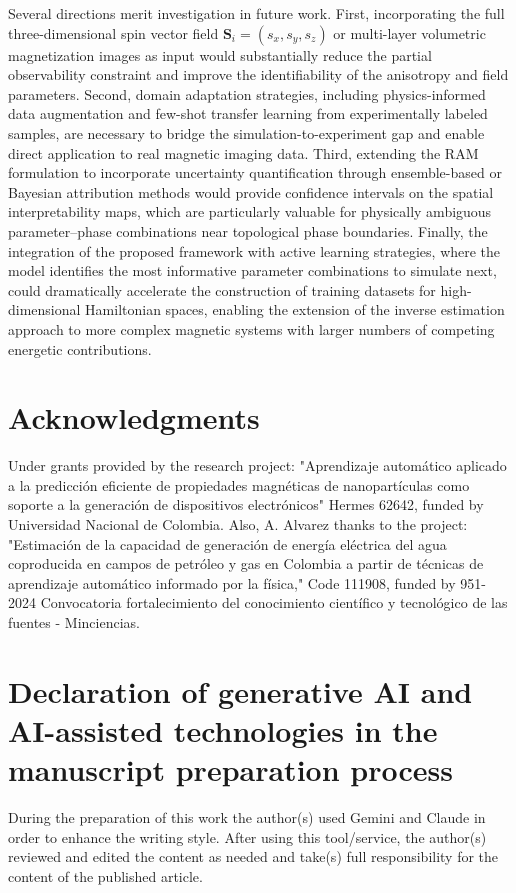 \documentclass[a4paper,fleqn]{cas-sc}
\begin{document}
Several directions merit investigation in future work. First,
incorporating the full three-dimensional spin vector field
$\mathbf{S}_i = (s_x, s_y, s_z)$ or multi-layer volumetric
magnetization images as input would substantially reduce the partial
observability constraint and improve the identifiability of the
anisotropy and field parameters. Second, domain adaptation strategies, including physics-informed data augmentation and few-shot transfer
learning from experimentally labeled samples, are necessary to
bridge the simulation-to-experiment gap and enable direct application
to real magnetic imaging data. Third, extending the RAM formulation to
incorporate uncertainty quantification through ensemble-based or
Bayesian attribution methods would provide confidence intervals on the
spatial interpretability maps, which are particularly valuable for
physically ambiguous parameter--phase combinations near topological
phase boundaries. Finally, the integration of the proposed framework
with active learning strategies, where the model identifies the
most informative parameter combinations to simulate next, could
dramatically accelerate the construction of training datasets for
high-dimensional Hamiltonian spaces, enabling the extension of the
inverse estimation approach to more complex magnetic systems with
larger numbers of competing energetic contributions.


\section*{Acknowledgments}
Under grants provided by the research project: "Aprendizaje automático aplicado a la predicción eficiente de propiedades magnéticas de nanopartículas como soporte a la generación de dispositivos electrónicos" Hermes 62642, funded by Universidad Nacional de Colombia. Also, A. Alvarez thanks to the project: "Estimación de la capacidad de generación de energía eléctrica del agua coproducida en campos de petróleo y gas en Colombia a partir de técnicas de aprendizaje automático informado por la física," Code 111908, funded by 951-2024 Convocatoria fortalecimiento del conocimiento científico y tecnológico de las fuentes - Minciencias.

\section*{Declaration of generative AI and AI-assisted technologies in the manuscript preparation process}

During the preparation of this work the author(s) used Gemini and Claude in order to enhance the writing style. After using this tool/service, the author(s) reviewed and edited the content as needed and take(s) full responsibility for the content of the published article.



%
%



\end{document}
